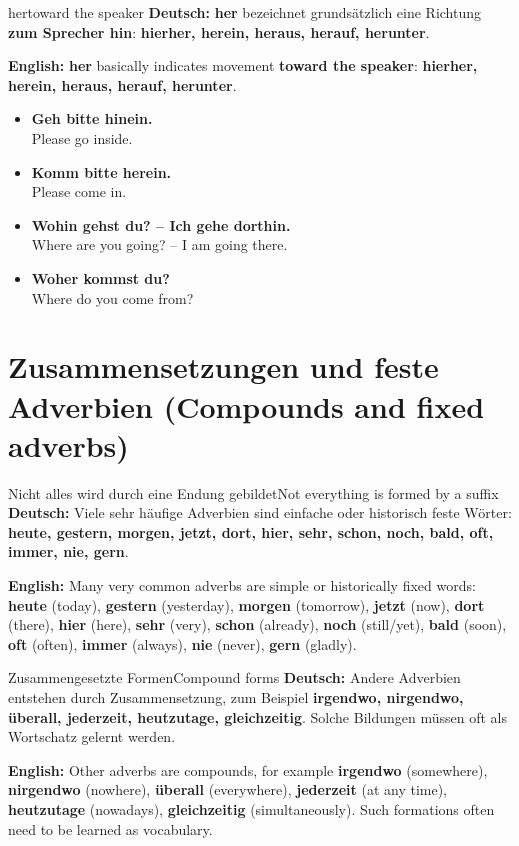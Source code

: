 \documentclass[a4paper,11pt]{article}
\newcommand{\GermanText}[1]{\textbf{Deutsch: }#1\par}
\newcommand{\EnglishText}[1]{{\small\color{SoftGray}\textbf{English: }#1\par}}
\newcommand{\ExampleItem}[2]{\item \textbf{#1}\\{\small\color{SoftGray}#2}}
\newcommand{\BSection}[2]{\section{#1 \textnormal{\small (#2)}}}
\begin{document}
\begin{grammarentry}{her}{toward the speaker}
\GermanText{\textbf{her} bezeichnet grundsätzlich eine Richtung \textbf{zum Sprecher hin}: \textbf{hierher, herein, heraus, herauf, herunter}.}
\EnglishText{\textbf{her} basically indicates movement \textbf{toward the speaker}: \textbf{hierher, herein, heraus, herauf, herunter}.}
\end{grammarentry}

\begin{exbox}
\begin{itemize}
\ExampleItem{Geh bitte hinein.}{Please go inside.}
\ExampleItem{Komm bitte herein.}{Please come in.}
\ExampleItem{Wohin gehst du? -- Ich gehe dorthin.}{Where are you going? -- I am going there.}
\ExampleItem{Woher kommst du?}{Where do you come from?}
\end{itemize}
\end{exbox}

\BSection{Zusammensetzungen und feste Adverbien}{Compounds and fixed adverbs}

\begin{grammarentry}{Nicht alles wird durch eine Endung gebildet}{Not everything is formed by a suffix}
\GermanText{Viele sehr häufige Adverbien sind einfache oder historisch feste Wörter: \textbf{heute, gestern, morgen, jetzt, dort, hier, sehr, schon, noch, bald, oft, immer, nie, gern}.}
\EnglishText{Many very common adverbs are simple or historically fixed words: \textbf{heute} (today), \textbf{gestern} (yesterday), \textbf{morgen} (tomorrow), \textbf{jetzt} (now), \textbf{dort} (there), \textbf{hier} (here), \textbf{sehr} (very), \textbf{schon} (already), \textbf{noch} (still/yet), \textbf{bald} (soon), \textbf{oft} (often), \textbf{immer} (always), \textbf{nie} (never), \textbf{gern} (gladly).}
\end{grammarentry}

\begin{grammarentry}{Zusammengesetzte Formen}{Compound forms}
\GermanText{Andere Adverbien entstehen durch Zusammensetzung, zum Beispiel \textbf{irgendwo, nirgendwo, überall, jederzeit, heutzutage, gleichzeitig}. Solche Bildungen müssen oft als Wortschatz gelernt werden.}
\EnglishText{Other adverbs are compounds, for example \textbf{irgendwo} (somewhere), \textbf{nirgendwo} (nowhere), \textbf{überall} (everywhere), \textbf{jederzeit} (at any time), \textbf{heutzutage} (nowadays), \textbf{gleichzeitig} (simultaneously). Such formations often need to be learned as vocabulary.}
\end{grammarentry}
\end{document}
